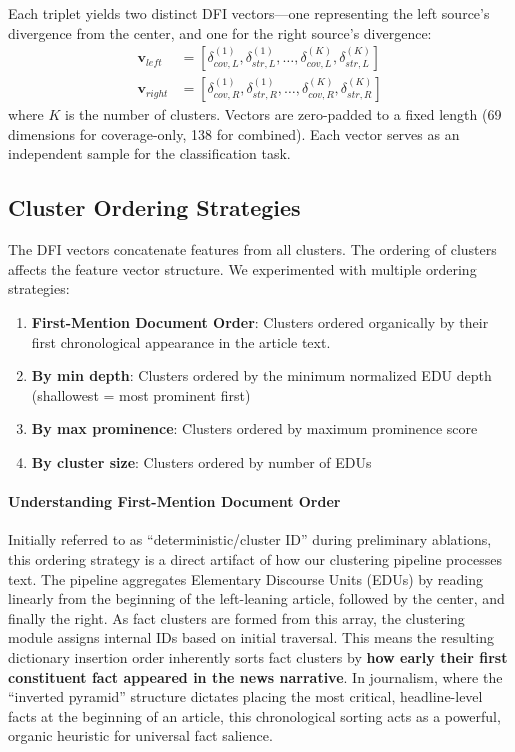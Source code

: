 \documentclass[11pt]{article}
\begin{document}
Each triplet yields two distinct DFI vectors—one representing the left source's divergence from the center, and one for the right source's divergence:
\begin{align}
\mathbf{v}_{left} &= [\delta^{(1)}_{cov,L}, \delta^{(1)}_{str,L}, \ldots, \delta^{(K)}_{cov,L}, \delta^{(K)}_{str,L}] \\
\mathbf{v}_{right} &= [\delta^{(1)}_{cov,R}, \delta^{(1)}_{str,R}, \ldots, \delta^{(K)}_{cov,R}, \delta^{(K)}_{str,R}]
\end{align}
where $K$ is the number of clusters. Vectors are zero-padded to a fixed length (69 dimensions for coverage-only, 138 for combined). Each vector serves as an independent sample for the classification task.

\subsection{Cluster Ordering Strategies}

The DFI vectors concatenate features from all clusters. The ordering of clusters affects the feature vector structure. We experimented with multiple ordering strategies:

\begin{enumerate}
    \item \textbf{First-Mention Document Order}: Clusters ordered organically by their first chronological appearance in the article text.
    \item \textbf{By min depth}: Clusters ordered by the minimum normalized EDU depth (shallowest = most prominent first)
    \item \textbf{By max prominence}: Clusters ordered by maximum prominence score
    \item \textbf{By cluster size}: Clusters ordered by number of EDUs
\end{enumerate}

\paragraph{Understanding First-Mention Document Order}
Initially referred to as ``deterministic/cluster ID'' during preliminary ablations, this ordering strategy is a direct artifact of how our clustering pipeline processes text. The pipeline aggregates Elementary Discourse Units (EDUs) by reading linearly from the beginning of the left-leaning article, followed by the center, and finally the right. As fact clusters are formed from this array, the clustering module assigns internal IDs based on initial traversal. This means the resulting dictionary insertion order inherently sorts fact clusters by \textbf{how early their first constituent fact appeared in the news narrative}. In journalism, where the ``inverted pyramid'' structure dictates placing the most critical, headline-level facts at the beginning of an article, this chronological sorting acts as a powerful, organic heuristic for universal fact salience.
\end{document}
